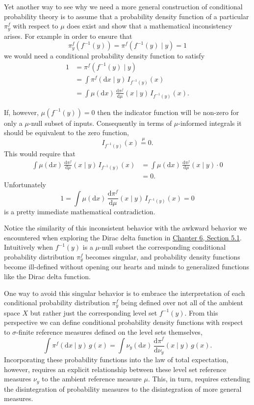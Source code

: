 \documentclass[
  letterpaper,
  DIV=11,
  numbers=noendperiod]{scrartcl}
\begin{document}
Yet another way to see why we need a more general construction of
conditional probability theory is to assume that a probability density
function of a particular \(\pi^{f}_{y}\) with respect to \(\mu\) does
exist and show that a mathematical inconsistency arises. For example in
order to ensure that \[
\pi^{f}_{y}( f^{-1}(y) ) = \pi^{f}( f^{-1}(y) \mid y) = 1
\] we would need a conditional probability density function to satisfy
\begin{align*}
1
&=
\pi^{f}( f^{-1}(y) \mid y)
\\
&=
\int \pi^{f}( \mathrm{d} x \mid y) \, I_{f^{-1}(y)}(x)
\\
&=
\int \mu( \mathrm{d} x) \,
\frac{ \mathrm{d}  \pi^{f} }{ \mathrm{d}  \mu  }(x \mid y) \, I_{f^{-1}(y)}(x).
\end{align*}

If, however, \(\mu( f^{-1}(y) ) = 0\) then the indicator function will
be non-zero for only a \(\mu\)-null subset of inputs. Consequently in
terms of \(\mu\)-informed integrals it should be equivalent to the zero
function, \[
I_{f^{-1}(y)}(x) \overset{\mu}{=} 0.
\] This would require that \begin{align*}
\int \mu( \mathrm{d} x) \,
\frac{ \mathrm{d}  \pi^{f} }{ \mathrm{d}  \mu  }(x \mid y) \, I_{f^{-1}(y)}(x)
&=
\int \mu( \mathrm{d} x) \,
\frac{ \mathrm{d}  \pi^{f} }{ \mathrm{d}  \mu  }(x \mid y) \cdot 0
\\
&= 0.
\end{align*} Unfortunately \[
1 = \int \mu( \mathrm{d} x) \,
\frac{ \mathrm{d}  \pi^{f} }{ \mathrm{d}  \mu  }(x \mid y) \, I_{f^{-1}(y)}(x) = 0
\] is a pretty immediate mathematical contradiction.

Notice the similarity of this inconsistent behavior with the awkward
behavior we encountered when exploring the Dirac delta function in
\href{https://betanalpha.github.io/assets/chapters_html/density_functions.html}{Chapter
6, Section 5.1}. Intuitively when \(f^{-1}(y)\) is a \(\mu\)-null subset
the corresponding conditional probability distribution \(\pi^{f}_{y}\)
becomes singular, and probability density functions become ill-defined
without opening our hearts and minds to generalized functions like the
Dirac delta function.

One way to avoid this singular behavior is to embrace the interpretation
of each conditional probability distribution \(\pi^{f}_{y}\) being
defined over not all of the ambient space \(X\) but rather just the
corresponding level set \(f^{-1}(y)\). From this perspective we can
define conditional probability density functions with respect to
\(\sigma\)-finite reference measures defined on the level sets
themselves, \[
\int \pi^{f}( \mathrm{d} x \mid y ) \, g(x)
=
\int \nu_{y}( \mathrm{d} x ) \,
\frac{ \mathrm{d}  \pi^{f} }{ \mathrm{d}  \nu_{y}  } (x \mid y) \, g(x).
\] Incorporating these probability functions into the law of total
expectation, however, requires an explicit relationship between these
level set reference measures \(\nu_{y}\) to the ambient reference
measure \(\mu\). This, in turn, requires extending the disintegration of
probability measures to the disintegration of more general measures.
\end{document}
